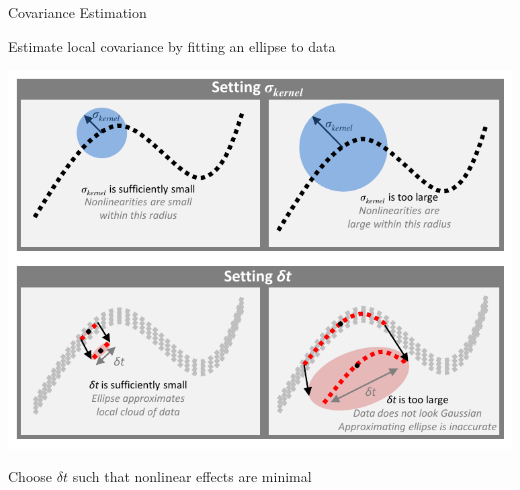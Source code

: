 \documentclass[12pt]{beamer}
\begin{document}
\begin{frame}{Covariance Estimation}

\centering

 
Estimate local covariance by fitting an ellipse to data

\vspace{0.5cm}

\includegraphics[width=\textwidth, trim=0cm 0cm 0cm 5cm, clip]{schematic}

\vspace{0.5cm}

Choose $\delta t$ such that nonlinear effects are minimal 

\end{frame}
\end{document}
